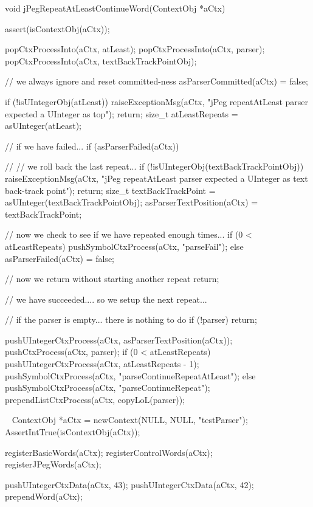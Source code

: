 \startCCode
void jPegRepeatAtLeastContinueWord(ContextObj *aCtx) {
  assert(isContextObj(aCtx));
  
  popCtxProcessInto(aCtx, atLeast);
  popCtxProcessInto(aCtx, parser);
  popCtxProcessInto(aCtx, textBackTrackPointObj);
    
  // we always ignore and reset committed-ness
  asParserCommitted(aCtx) = false;
  
  if (!isUIntegerObj(atLeast)) {
    raiseExceptionMsg(aCtx,
      "jPeg repeatAtLeast parser expected a UInteger as top");
    return;
  }
  size_t atLeastRepeats = asUInteger(atLeast);
  
  // if we have failed...
  if (asParserFailed(aCtx)) {
    //
    // we roll back the last repeat...
    if (!isUIntegerObj(textBackTrackPointObj)) {
      raiseExceptionMsg(aCtx,
        "jPeg repeatAtLeast parser expected a UInteger as text back-track point");
      return;
    }
    size_t textBackTrackPoint = asUInteger(textBackTrackPointObj);
    asParserTextPosition(aCtx) = textBackTrackPoint;
    
    // now we check to see if we have repeated enough times...
    if (0 < atLeastRepeats) {
      pushSymbolCtxProcess(aCtx, "parseFail");
    } else {
      asParserFailed(aCtx) = false;
    }
    
    // now we return without starting another repeat
    return;
  }
  
  // we have succeeded.... so we setup the next repeat...
  
  // if the parser is empty... there is nothing to do
  if (!parser) return;

  pushUIntegerCtxProcess(aCtx, asParserTextPosition(aCtx));
  pushCtxProcess(aCtx, parser);
  if (0 < atLeastRepeats) {
    pushUIntegerCtxProcess(aCtx, atLeastRepeats - 1);
    pushSymbolCtxProcess(aCtx, "parseContinueRepeatAtLeast");
  } else {
    pushSymbolCtxProcess(aCtx, "parseContinueRepeat");
  }
  prependListCtxProcess(aCtx, copyLoL(parser));
}
\stopCCode

\CTestsSuiteSetup\
\startCTest
  ContextObj *aCtx = newContext(NULL, NULL, "testParser");
  AssertIntTrue(isContextObj(aCtx));
  
  registerBasicWords(aCtx);
  registerControlWords(aCtx);
  registerJPegWords(aCtx);
  
  pushUIntegerCtxData(aCtx, 43);
  pushUIntegerCtxData(aCtx, 42);
  prependWord(aCtx);
\stopCTest


